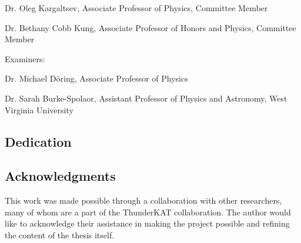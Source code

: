 \documentclass[12pt]{article}
\begin{document}

\indent Dr. Oleg Kargaltsev, Associate Professor of Physics, Committee Member
\vspace{12pt}

\indent Dr. Bethany Cobb Kung, Associate Professor of Honors and Physics, Committee Member
\vspace{24pt}

\noindent Examiners:

\vspace{12pt}
\indent Dr. Michael D\"oring, Associate Professor of Physics

\vspace{12pt}

\indent Dr. Sarah Burke-Spolaor, Assistant Professor of Physics and Astronomy, West Virginia University


\newpage
{} \label{dedication}
\begin{center}
\section*{\textbf{Dedication}}
\end{center}
\begin{center}
\vspace*{6pt}

\end{center}

\doublespacing
\newpage
{} \label{acknowledgements}
\begin{center}
\section*{Acknowledgments}
\end{center}
\vspace*{6pt}
\doublespacing
This work was made possible through a collaboration with other researchers, many of whom are a part of the ThunderKAT collaboration. The author would like to acknowledge their assistance in making the project possible and refining the content of the thesis itself. 
\end{document}
